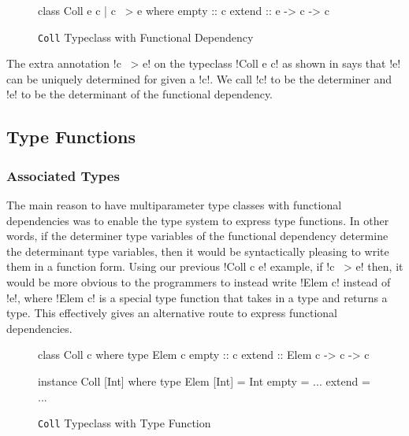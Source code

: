 \documentclass[manuscript,screen,nonacm]{acmart}
\begin{document}
\begin{figure}[ht]
  \begin{CenteredBox}
    \begin{code}
      class Coll e c | c ~> e where
      empty :: c
      extend :: e -> c -> c
    \end{code}
  \end{CenteredBox}
  \caption[Coll typeclass]{\lstinline{Coll} Typeclass with Functional Dependency}
  \label{fig:tc-collection-fd}
\end{figure}

The extra annotation !c ~> e! on the typeclass !Coll e c! as shown in  says that !e! can be uniquely determined for given a !c!.
We call !c! to be the determiner and !e! to be the determinant of the functional dependency.

%

\subsection{Type Functions}
\subsubsection{Associated Types}
The main reason to have multiparameter type classes with functional dependencies was to enable the type system to express type functions. In other words, if the determiner type variables of the functional dependency determine the determinant type variables, then it would be syntactically pleasing to write them in a function form.
Using our previous !Coll c e! example, if !c ~> e! then, it would be more obvious to the programmers to instead write !Elem c! instead of !e!, where !Elem c! is a special type function that takes in a type and returns a type. This effectively gives an alternative route to express functional dependencies.
\begin{figure}[ht]
  \begin{center}
    \begin{minipage}[ht]{0.4\linewidth}
      \begin{code}
        class Coll c where
           type Elem c
           empty :: c
           extend :: Elem c -> c -> c
      \end{code}
    \end{minipage}%
    \begin{minipage}[ht]{0.4\linewidth}
      \begin{code}
        instance Coll [Int] where
           type Elem [Int] = Int
           empty = ...
           extend = ...
      \end{code}
    \end{minipage}
  \end{center}
  \caption[Coll typeclass]{\lstinline{Coll} Typeclass with Type Function}
  \label{fig:type-fam}
\end{figure}
\end{document}

